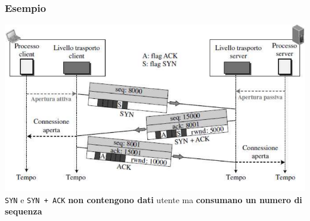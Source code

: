 \documentclass[10pt]{article}
\begin{document}
\subsubsection{Esempio}
\begin{center}
\includegraphics[scale=0.65]{handshakeesempio.png}\\
\texttt{SYN} e \texttt{SYN + ACK} \textbf{non contengono dati} utente ma \textbf{consumano un numero di sequenza}
\end{center}
\pagebreak
\end{document}
